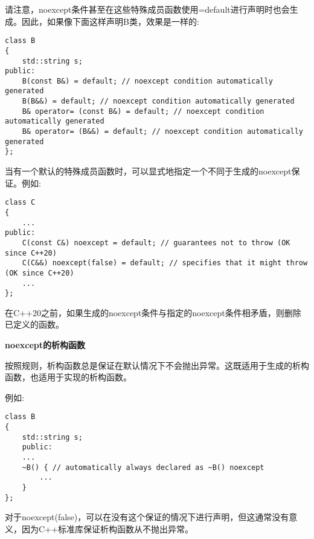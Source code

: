 请注意，noexcept条件甚至在这些特殊成员函数使用=default进行声明时也会生成。因此，如果像下面这样声明B类，效果是一样的:\par

\begin{lstlisting}[caption={}]
class B
{
	std::string s;
public:
	B(const B&) = default; // noexcept condition automatically generated
	B(B&&) = default; // noexcept condition automatically generated
	B& operator= (const B&) = default; // noexcept condition automatically generated
	B& operator= (B&&) = default; // noexcept condition automatically generated
};
\end{lstlisting}

当有一个默认的特殊成员函数时，可以显式地指定一个不同于生成的noexcept保证。例如:\par

\begin{lstlisting}[caption={}]
class C
{
	...
public:
	C(const C&) noexcept = default; // guarantees not to throw (OK since C++20)
	C(C&&) noexcept(false) = default; // specifies that it might throw (OK since C++20)
	...
};
\end{lstlisting}

在C++20之前，如果生成的noexcept条件与指定的noexcept条件相矛盾，则删除已定义的函数。\par

\hspace*{\fill} \par %
\textbf{noexcept的析构函数}

按照规则，析构函数总是保证在默认情况下不会抛出异常。这既适用于生成的析构函数，也适用于实现的析构函数。\par

例如:\par

\begin{lstlisting}[caption={}]
class B
{
	std::string s;
	public:
	...
	~B() { // automatically always declared as ~B() noexcept
		...
	}
};
\end{lstlisting}

对于noexcept(false)，可以在没有这个保证的情况下进行声明，但这通常没有意义，因为C++标准库保证析构函数从不抛出异常。\par



































